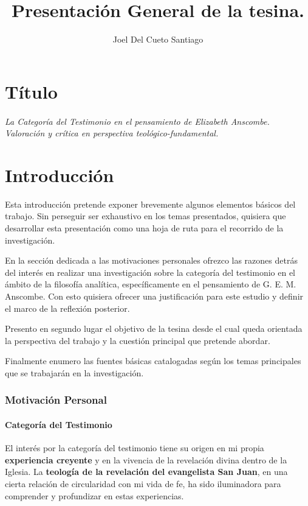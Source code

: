 \documentclass[11pt]{article}
\title{Presentación General de la tesina.}
\author{Joel Del Cueto Santiago}
\begin{document}
\maketitle

\part*{Título}
\paragraph{\noindent La Categoría del Testimonio en el pensamiento de Elizabeth Anscombe.\\
\emph{Valoración y crítica en perspectiva teológico-fundamental.}}

\part*{Introducción}

Esta introducción pretende exponer brevemente algunos elementos básicos del trabajo. Sin perseguir ser exhaustivo en los temas presentados, quisiera que desarrollar esta presentación como una hoja de ruta para el recorrido de la investigación.

En la sección dedicada a las motivaciones personales ofrezco las razones detrás del interés en realizar una investigación sobre la categoría del testimonio en el ámbito de la filosofía analítica, específicamente en el pensamiento de G. E. M. Anscombe. Con esto quisiera ofrecer una justificación para este estudio y definir el marco de la reflexión posterior.

Presento en segundo lugar el objetivo de la tesina desde el cual queda orientada la perspectiva del trabajo y la cuestión principal que pretende abordar.

Finalmente enumero las fuentes básicas catalogadas según los temas principales que se trabajarán en la investigación.

\section{Motivación Personal}

\subsection{Categoría del Testimonio}

El interés por la categoría del testimonio tiene su origen en mi propia \textbf{experiencia creyente} y en la vivencia de la revelación divina dentro de la Iglesia. La \textbf{teología de la revelación del evangelista San Juan}, en una cierta relación de circularidad con mi vida de fe, ha sido iluminadora para comprender y profundizar en estas experiencias.
\end{document}
